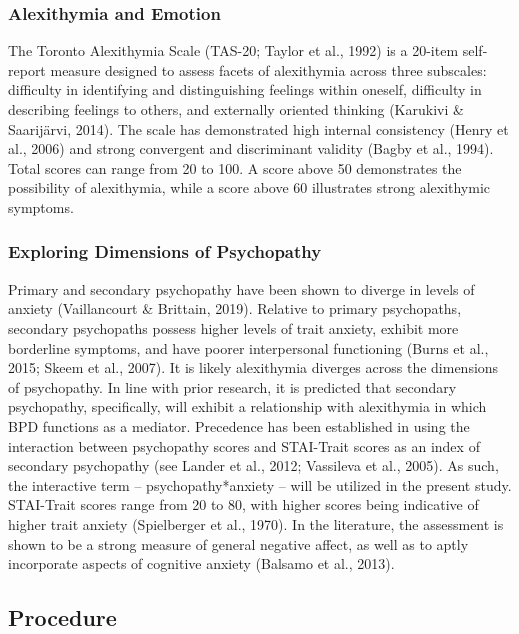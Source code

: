 \documentclass[
  man,floatsintext]{apa7}
\begin{document}
\hypertarget{alexithymia-and-emotion}{%
\subsubsection{Alexithymia and Emotion}\label{alexithymia-and-emotion}}

The Toronto Alexithymia Scale (TAS-20; Taylor et al., 1992) is a 20-item self-report measure designed to assess facets of alexithymia across three subscales: difficulty in identifying and distinguishing feelings within oneself, difficulty in describing feelings to others, and externally oriented thinking (Karukivi \& Saarijärvi, 2014). The scale has demonstrated high internal consistency (Henry et al., 2006) and strong convergent and discriminant validity (Bagby et al., 1994). Total scores can range from 20 to 100. A score above 50 demonstrates the possibility of alexithymia, while a score above 60 illustrates strong alexithymic symptoms.

\hypertarget{exploring-dimensions-of-psychopathy}{%
\subsubsection{Exploring Dimensions of Psychopathy}\label{exploring-dimensions-of-psychopathy}}

Primary and secondary psychopathy have been shown to diverge in levels of anxiety (Vaillancourt \& Brittain, 2019). Relative to primary psychopaths, secondary psychopaths possess higher levels of trait anxiety, exhibit more borderline symptoms, and have poorer interpersonal functioning (Burns et al., 2015; Skeem et al., 2007). It is likely alexithymia diverges across the dimensions of psychopathy. In line with prior research, it is predicted that secondary psychopathy, specifically, will exhibit a relationship with alexithymia in which BPD functions as a mediator. Precedence has been established in using the interaction between psychopathy scores and STAI-Trait scores as an index of secondary psychopathy (see Lander et al., 2012; Vassileva et al., 2005). As such, the interactive term -- psychopathy*anxiety -- will be utilized in the present study. STAI-Trait scores range from 20 to 80, with higher scores being indicative of higher trait anxiety (Spielberger et al., 1970). In the literature, the assessment is shown to be a strong measure of general negative affect, as well as to aptly incorporate aspects of cognitive anxiety (Balsamo et al., 2013).

\hypertarget{procedure}{%
\subsection{Procedure}\label{procedure}}
\end{document}
